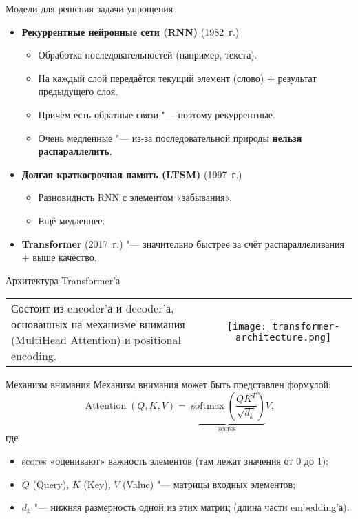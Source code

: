 \begin{frame}[fragile]{Модели для решения задачи упрощения}%
  \begin{itemize}%
    \item \textbf{Рекуррентные нейронные сети (RNN)} (1982~г.)
      \begin{itemize}%
         \item Обработка последовательностей (например, текста).
         \item На каждый слой передаётся текущий элемент (слово) + результат предыдущего слоя.
         \item Причём есть обратные связи "--- поэтому рекуррентные.
         \item Очень медленные "--- из-за последовательной природы \textbf{нельзя распараллелить}.
       \end{itemize} 
    \item \textbf{Долгая краткосрочная память (LTSM)} (1997~г.)
      \begin{itemize}%
        \item Разновиднсть RNN с элементом «забывания».
        \item Ещё медленнее.
      \end{itemize}
    \item \textbf{Transformer} (2017~г.) "--- значительно быстрее за счёт распараллеливания + выше качество.
  \end{itemize}
\end{frame}


\begin{frame}[fragile]{Архитектура Transformer'а}%
  \noindent\begin{tabularx}{\textwidth}{LC}%
    Состоит из encoder'а и decoder'а, основанных на механизме внимания (MultiHead Attention) и positional encoding. & 
    \texttt{[image: transformer-architecture.png]}
  \end{tabularx}
\end{frame}


\begin{frame}[fragile]{Механизм внимания}%
  Механизм внимания может быть представлен формулой:
  \begin{equation}\label{scaled-dot-product-attention}%
    \operatorname{Attention}(Q, K, V) = \underbrace{
      \operatorname{softmax}\left(
        \frac{QK^T}{\sqrt{d_k}}
      \right)
    }_{\text{scores}}
    V,
  \end{equation}
  где
  \begin{itemize}%
    \item scores «оценивают» важность элементов (там лежат значения от 0 до 1);
    \item $Q$ (Query), $K$ (Key), $V$ (Value) "--- матрицы входных элементов;
    \item $d_k$ "--- нижняя размерность одной из этих матриц (длина части embedding'а).
  \end{itemize}
\end{frame}


